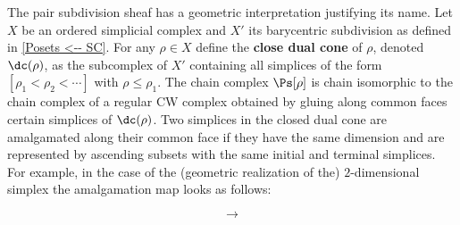 \documentclass[thesis.tex]{subfiles}
\begin{document}
\begin{remark}\label{pair subdivision related to dual cones}
The pair subdivision sheaf has a geometric interpretation justifying its name. Let $X$ be an ordered simplicial complex and $X'$ its barycentric subdivision as defined in \ref{Posets <-- SC}. For any $\rho\in X$ define the \textbf{close dual cone} of $\rho$, denoted $\dc(\rho)$, as the subcomplex of $X'$ containing all simplices of the form $[\rho_1<\rho_2<\dotsb]$ with $\rho\leq\rho_1$. The chain complex $\Ps[\rho]$ is chain isomorphic to the chain complex of a regular CW complex obtained by gluing along common faces certain simplices of $\dc(\rho)$. Two simplices in the closed dual cone are amalgamated along their common face if they have the same dimension and are represented by ascending subsets with the same initial and terminal simplices. For example, in the case of the (geometric realization of the) $2$-dimensional simplex the amalgamation map looks as follows:\vspace*{0pt}

\begin{minipage}{6cm}
\begin{center}\hspace*{3cm}
\end{center}
\end{minipage}
\begin{minipage}{1cm}
\vspace*{-.6cm}$$\longrightarrow$$
\end{minipage}
\begin{minipage}{6cm}
    \begin{center}
    \hspace*{3.2cm}
\end{center}
\end{minipage}\vspace*{10pt}


\end{remark}
\end{document}
